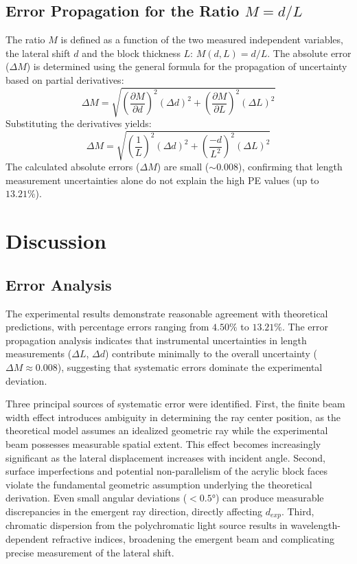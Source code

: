 \documentclass[12pt, a4paper]{article}
\begin{document}
\subsection{Error Propagation for the Ratio $M = d/L$}
The ratio $M$ is defined as a function of the two measured independent variables, the lateral shift $d$ and the block thickness $L$: $M(d,L) = d/L$. The absolute error ($\Delta M$) is determined using the general formula for the propagation of uncertainty based on partial derivatives:
$$\Delta M=\sqrt{\left(\frac{\partial M}{\partial d}\right)^{2}\left(\Delta d\right)^{2}+\left(\frac{\partial M}{\partial L}\right)^{2}\left(\Delta L\right)^{2}}$$
Substituting the derivatives yields:
$$\Delta M=\sqrt{\left(\frac{1}{L}\right)^{2}\left(\Delta d\right)^{2}+\left(\frac{-d}{L^{2}}\right)^{2}\left(\Delta L\right)^{2}}$$
The calculated absolute errors ($\Delta M$) are small ($\sim 0.008$), confirming that length measurement uncertainties alone do not explain the high PE values (up to $13.21\%$).

\section{Discussion}

\subsection{Error Analysis}

The experimental results demonstrate reasonable agreement with theoretical predictions, with percentage errors ranging from $4.50\%$ to $13.21\%$. The error propagation analysis indicates that instrumental uncertainties in length measurements ($\Delta L$, $\Delta d$) contribute minimally to the overall uncertainty ($\Delta M \approx 0.008$), suggesting that systematic errors dominate the experimental deviation.

Three principal sources of systematic error were identified. First, the finite beam width effect introduces ambiguity in determining the ray center position, as the theoretical model assumes an idealized geometric ray while the experimental beam possesses measurable spatial extent. This effect becomes increasingly significant as the lateral displacement increases with incident angle. Second, surface imperfections and potential non-parallelism of the acrylic block faces violate the fundamental geometric assumption underlying the theoretical derivation. Even small angular deviations ($<0.5°$) can produce measurable discrepancies in the emergent ray direction, directly affecting $d_{exp}$. Third, chromatic dispersion from the polychromatic light source results in wavelength-dependent refractive indices, broadening the emergent beam and complicating precise measurement of the lateral shift.
\end{document}
